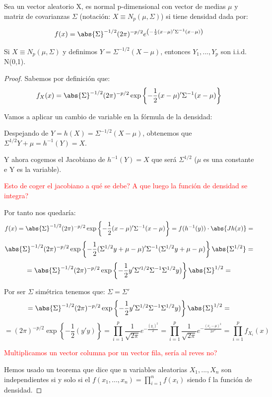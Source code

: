 \documentclass[palatino,nochap]{apuntes}
\begin{document}
\begin{defn}
Sea un vector aleatorio X, es normal p-dimensional con vector de medias $\mu$ y matriz de covarianzas $\Sigma$ (notación: $X\equiv N_p(\mu, \Sigma)$) si tiene densidad dada por:

\[
f(x)=\abs{\Sigma}^{-1/2}(2\pi)^{-p/2} e^{\left( -\frac{1}{2}(x-\mu)'\Sigma^{-1}(x-\mu) \right)}
\]
\end{defn}

\begin{prop} Si $X \equiv N_p(\mu, \Sigma)$ y definimos $Y = \Sigma^{-1/2}(X-\mu)$, entonces $Y_1,...,Y_p$ son i.i.d. N(0,1).\end{prop}

\begin{proof}
Sabemos por definición que:
\[
f_X(x)=\abs{\Sigma}^{-1/2}(2\pi)^{-p/2} \exp \left\{ -\frac{1}{2}(x-\mu)'\Sigma^{-1}(x-\mu) \right\}
\]

Vamos a aplicar un cambio de variable en la fórmula de la densidad:

Despejando de $Y = h(X)= \Sigma^{-1/2}(X-\mu)$, obtenemos que $\Sigma^{1/2}Y+\mu=h^{-1}(Y)=X$.

Y ahora cogemos el Jacobiano de $h^{-1}(Y)=X$ que será $\Sigma^{1/2}$ ($\mu$ es una constante e Y es la variable).

\textcolor{red}{Esto de coger el jacobiano a qué se debe? A que luego la función de densidad se integra?}


Por tanto nos quedaría:
\[
f(x) = \abs{\Sigma}^{-1/2}(2\pi)^{-p/2} \exp \left\{ -\frac{1}{2}(x-\mu)'\Sigma^{-1}(x-\mu) \right\} = f(h^{-1}(y))\cdot\abs{Jh(x)} =
\]
\[ 
\abs{\Sigma}^{-1/2}(2 \pi)^{-p/2} \exp\left\{-\frac{1}{2}(\Sigma^{1/2}y+\mu-\mu)'\Sigma^{-1}(\Sigma^{1/2}y+\mu-\mu)  \right\} \abs{\Sigma^{1/2}}  =
\]
\[
= \abs{\Sigma}^{-1/2}(2 \pi)^{-p/2} \exp\left\{-\frac{1}{2}y'\Sigma'^{1/2}\Sigma^{-1}\Sigma^{1/2}y)  \right\} \abs{\Sigma}^{1/2} =
\]

Por ser $\Sigma$ simétrica tenemos que: $\Sigma = \Sigma'$
\[
= \abs{\Sigma}^{-1/2}(2 \pi)^{-p/2} \exp\left\{-\frac{1}{2}y'\Sigma^{1/2}\Sigma^{-1}\Sigma^{1/2}y)  \right\} \abs{\Sigma}^{1/2} =
\]
\[
= (2 \pi)^{-p/2} \exp\left\{-\frac{1}{2}(y'y) \right\} = \prod_{i=1}^{p} \frac{1}{\sqrt{2\pi}} e^{-\frac{(y_i)^2}{2}} =  \prod_{i=1}^{p} \frac{1}{\sqrt{2\pi}} e^{-\frac{(x_i-\mu)^2}{2\sigma^2}} =\prod_{i=1}^{p} f_{X_{i}}(x)
\]

\textcolor{red}{Multiplicamos un vector columna por un vector fila, sería al reves no?}

Hemos usado un teorema que dice que n variables aleatorias $X_1,...,X_n$ son independientes si y solo si el $f(x_1,...,x_n)=\prod_{i=1}^{n}f(x_i)$ siendo f la función de densidad.

\end{proof}
\end{document}
